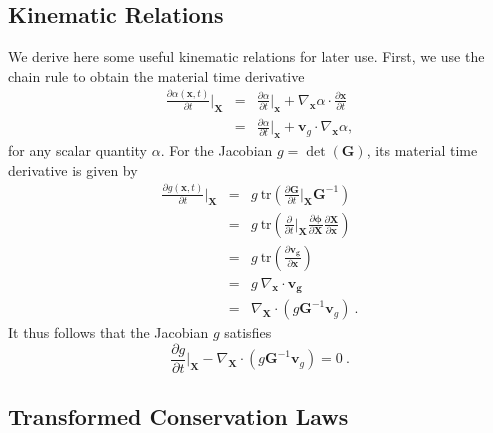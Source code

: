 \documentclass[11pt]{article}
\begin{document}
\subsection{Kinematic Relations}

We derive here some useful kinematic relations for later use. First, we use the chain rule to obtain the material time derivative
\begin{eqnarray}
\displaystyle \frac{\partial \alpha(\bm{x},t)}{\partial t}\Big|_{\bm{X}}  & =  &  \frac{\partial \alpha}{\partial t} \Big|_{\bm{x}} + \nabla_{\bm{x}} \alpha \cdot  \frac{\partial \bm{x}}{\partial t} \nonumber \\[1ex]
& =  &  \frac{\partial \alpha}{\partial t} \Big|_{\bm{x}} +  \bm{v}_g  \cdot \nabla_{\bm{x}} \alpha  ,
\end{eqnarray}
for any scalar quantity $\alpha$. For the Jacobian $g = \det (\bm{G})$, its material time derivative  is given by
\begin{eqnarray}
\displaystyle \frac{\partial g(\bm{x},t)}{\partial t}\Big|_{\bm{X}}  & =  & g \ \mathrm{tr} \left(\frac{\partial \bm{G}}{\partial t} \Big|_{\bm{X}} \bm{G}^{-1} \right)  \nonumber \\[1ex]
& =  &  g \ \mathrm{tr} \left(\frac{\partial }{\partial t} \Big|_{\bm{X}} \frac{\partial \bm{\phi}}{\partial \bm{X}}  \frac{\partial \bm{X}}{\partial \bm{x}}\right)  \nonumber \\[1ex]
& =  &  g \ \mathrm{tr} \left(\frac{\partial \bm{v}_{\bm{g}}}{\partial \bm{x}}\right)  \nonumber \\[1ex]
& =  &  g \ \nabla_{\bm{x}} \cdot \bm{v}_{\bm{g}} \nonumber \\[1ex]
& =  &  \nabla_{\bm{X}} \cdot (g \bm{G}^{-1} \bm{v}_{g} ) \  .
\end{eqnarray}
It thus follows that the Jacobian $g$ satisfies 
\begin{equation}
\displaystyle \frac{\partial g}{\partial t}\Big|_{\bm{X}} - \nabla_{\bm{X}} \cdot (g \bm{G}^{-1} \bm{v}_{g} ) = 0 \ .
\end{equation}

\subsection{Transformed Conservation Laws}
\end{document}
